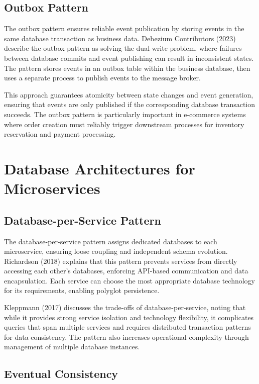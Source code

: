 \subsection{Outbox Pattern}

The outbox pattern ensures reliable event publication by storing events in the same database transaction as business data. Debezium Contributors (2023) describe the outbox pattern as solving the dual-write problem, where failures between database commits and event publishing can result in inconsistent states. The pattern stores events in an outbox table within the business database, then uses a separate process to publish events to the message broker.

This approach guarantees atomicity between state changes and event generation, ensuring that events are only published if the corresponding database transaction succeeds. The outbox pattern is particularly important in e-commerce systems where order creation must reliably trigger downstream processes for inventory reservation and payment processing.

\section{Database Architectures for Microservices}

\subsection{Database-per-Service Pattern}

The database-per-service pattern assigns dedicated databases to each microservice, ensuring loose coupling and independent schema evolution. Richardson (2018) explains that this pattern prevents services from directly accessing each other's databases, enforcing API-based communication and data encapsulation. Each service can choose the most appropriate database technology for its requirements, enabling polyglot persistence.

Kleppmann (2017) discusses the trade-offs of database-per-service, noting that while it provides strong service isolation and technology flexibility, it complicates queries that span multiple services and requires distributed transaction patterns for data consistency. The pattern also increases operational complexity through management of multiple database instances.

\subsection{Eventual Consistency}

